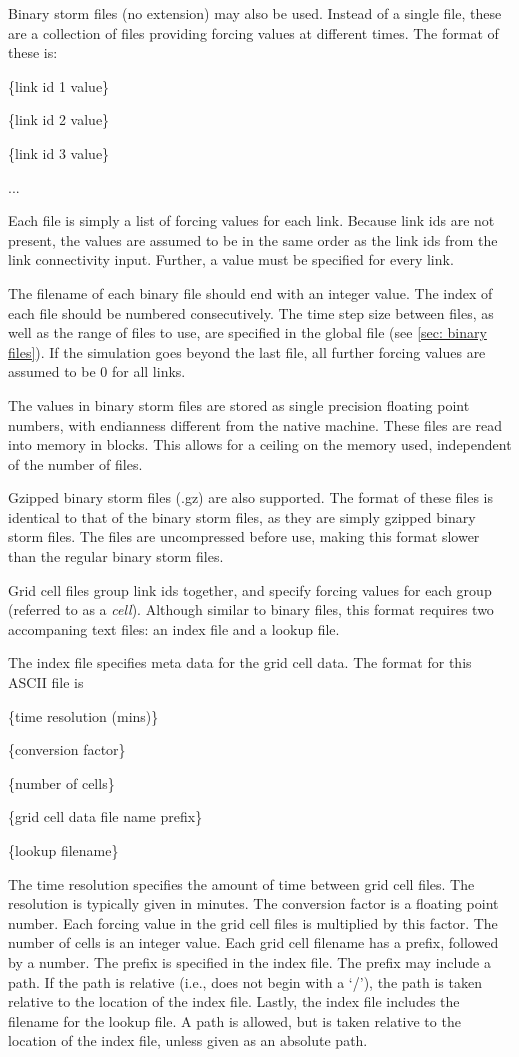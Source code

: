 \documentclass[12pt]{article}
\newenvironment{codeindent}
{\begin{list}{}
        {\setlength{\leftmargin}{.1in}}
        \item[]
}
{\end{list}}
\begin{document}
Binary storm files (no extension) may also be used. Instead of a single file, these are a collection of files providing forcing values at different times. The format of these is:
\begin{codeindent}
 \{link id 1 value\}
 
 \{link id 2 value\}
 
 \{link id 3 value\}
 
 ...
\end{codeindent}
Each file is simply a list of forcing values for each link. Because link ids are not present, the values are assumed to be in the same order as the link ids from the link connectivity input. Further, a value must be specified for every link.

The filename of each binary file should end with an integer value. The index of each file should be numbered consecutively. The time step size between files, as well as the range of files to use, are specified in the global file (see \ref{sec: binary files}). If the simulation goes beyond the last file, all further forcing values are assumed to be 0 for all links.

The values in binary storm files are stored as single precision floating point numbers, with endianness different from the native machine. These files are read into memory in blocks. This allows for a ceiling on the memory used, independent of the number of files.

Gzipped binary storm files (.gz) are also supported. The format of these files is identical to that of the binary storm files, as they are simply gzipped binary storm files. The files are uncompressed before use, making this format slower than the regular binary storm files.


Grid cell files group link ids together, and specify forcing values for each group (referred to as a \emph{cell}). Although similar to binary files, this format requires two accompaning text files: an index file and a lookup file.

The index file specifies meta data for the grid cell data. The format for this ASCII file is
\begin{codeindent}
 \{time resolution (mins)\}

 \{conversion factor\}
 
 \{number of cells\}
 
 \{grid cell data file name prefix\}
 
 \{lookup filename\}
\end{codeindent}
The time resolution specifies the amount of time between grid cell files. The resolution is typically given in minutes. The conversion factor is a floating point number. Each forcing value in the grid cell files is multiplied by this factor. The number of cells is an integer value. Each grid cell filename has a prefix, followed by a number. The prefix is specified in the index file. The prefix may include a path. If the path is relative (i.e., does not begin with a `/'), the path is taken relative to the location of the index file. Lastly, the index file includes the filename for the lookup file. A path is allowed, but is taken relative to the location of the index file, unless given as an absolute path.
\end{document}
